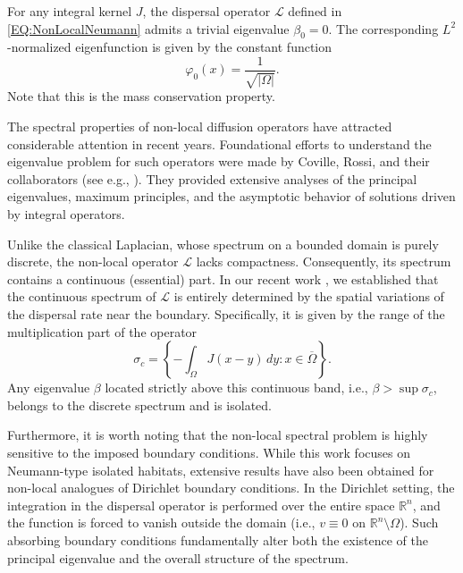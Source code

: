\documentclass[11pt, a4paper]{article}
\theoremstyle{break}
\theoremstyle{break}
\theoremstyle{break}
\theoremstyle{break}
\theoremstyle{break}
\theoremstyle{break}
\theoremstyle{break}
\theoremstyle{break}
\theoremstyle{break}
\theoremstyle{break}
\begin{document}
For any integral kernel $J$, the dispersal operator $\mathcal{L}$ defined in \eqref{EQ:NonLocalNeumann} admits a trivial eigenvalue $\beta_0 = 0$. The corresponding $L^2$-normalized eigenfunction is given by the constant function 
\begin{equation}
    \varphi_0(x) = \frac{1}{\sqrt{|\Omega|}}.
\end{equation}
Note that this is the mass conservation property.

The spectral properties of non-local diffusion operators have attracted considerable attention in recent years. Foundational efforts to understand the eigenvalue problem for such operators were made by Coville, Rossi, and their collaborators (see e.g., \cite{ChasseigneChavesRossi2006, Coville2010, GarciaMelianRossi2009}). They provided extensive analyses of the principal eigenvalues, maximum principles, and the asymptotic behavior of solutions driven by integral operators. 

Unlike the classical Laplacian, whose spectrum on a bounded domain is purely discrete, the non-local operator $\mathcal{L}$ lacks compactness. Consequently, its spectrum contains a continuous (essential) part. In our recent work \cite{Tadej2025}, we established that the continuous spectrum of $\mathcal{L}$ is entirely determined by the spatial variations of the dispersal rate near the boundary. Specifically, it is given by the range of the multiplication part of the operator
\begin{equation}
    \sigma_c = \left\{ -\int_\Omega J(x-y) \,dy : x \in \overline{\Omega} \right\}.
\end{equation}
Any eigenvalue $\beta$ located strictly above this continuous band, i.e., $\beta > \sup \sigma_c$, belongs to the discrete spectrum and is isolated.

Furthermore, it is worth noting that the non-local spectral problem is highly sensitive to the imposed boundary conditions. While this work focuses on Neumann-type isolated habitats, extensive results have also been obtained for non-local analogues of Dirichlet boundary conditions. In the Dirichlet setting, the integration in the dispersal operator is performed over the entire space $\mathbb{R}^n$, and the function is forced to vanish outside the domain (i.e., $v \equiv 0$ on $\mathbb{R}^n \setminus \Omega$). Such absorbing boundary conditions fundamentally alter both the existence of the principal eigenvalue and the overall structure of the spectrum. 
\end{document}
